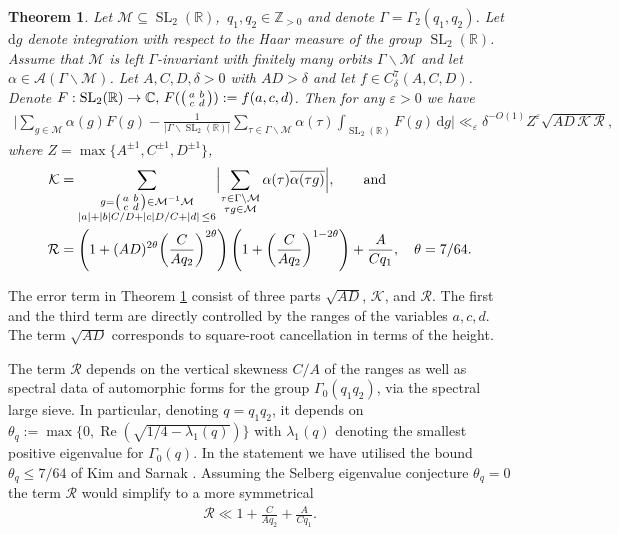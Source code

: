 \documentclass[12pt]{amsart}
\newtheorem{theorem}{Theorem}[section]
\theoremstyle{definition}
\theoremstyle{remark}
\numberwithin{equation}{section}
\newcommand{\C}{{\mathbb C}}
\newcommand{\R}{{\mathbb R}}
\newcommand{\Z}{{\mathbb Z}}
\newcommand{\1}{{\mathbf 1}}
\newcommand{\eps}{\varepsilon}
\newcommand{\SL}{\operatorname{SL}_2}
\renewcommand{\Re}{\operatorname{Re}}
\renewcommand{\c}{\mathfrak c}
\renewcommand{\d}{\mathrm d}
\begin{document}
\begin{theorem} \label{thm:mainblackbox}
Let $\mathcal{M} \subseteq \SL(\R)$,\, $q_1,q_2\in \Z_{>0}$ and denote $\Gamma = \Gamma_2(q_1,q_2)$. Let $\d g$ denote integration with respect to the Haar measure of the group $\SL(\R)$. Assume that $\mathcal{M}$ is left 
$\Gamma$-invariant with finitely many orbits $\Gamma \backslash \mathcal{M}$ and let $\alpha \in \mathcal{A}(\Gamma \backslash \mathcal{M})$.  Let $A,C,D,\delta > 0$  with $AD > \delta$ and let $f \in C^{7}_\delta (A,C,D)$. Denote $F:\SL(\R) \to \C, \, F(\smqty(a & b \\ c& d)):= f(a,c,d)$. Then for any $\eps > 0$ we have
\begin{align*}
   \bigg|  \sum_{g \in \mathcal{M}}  \alpha(g) F(g)  -  \frac{1}{|\Gamma \backslash \SL(\R) |} \sum_{\tau \in \Gamma \backslash \mathcal{M}} \alpha(\tau)  \int_{\SL(\R)} F(g) \, \d g \bigg|  \ll_\eps \delta^{-O(1)} Z^\eps  \sqrt{ AD \, \mathcal{K} \, \mathcal{R}},
\end{align*}
where $Z = \max\{A^{\pm 1},C^{\pm 1},D^{\pm 1}\}$,
\begin{align*}
\mathcal{K}& = \sum_{\substack{g =\smqty(a & b \\c & d) \in \mathcal{M}^{-1} \mathcal{M} \\  |a|+|b|C/D+|c|D/C+|d| \,\leq 6}}\Bigl|\sum_{ \substack{\tau\in \Gamma \backslash \mathcal{M} 
 \\ \tau g \in \mathcal{M}}} \alpha(\tau) \overline{\alpha(\tau g)} \Bigr|, \quad \quad\text{and} \\
\mathcal{R}& =    \left(1+ (AD)^{2\theta}\bigg( \frac{ C}{ A q_2}\bigg)^{2\theta} \right)\left(1+\bigg(\frac{C}{A q_2}\bigg)^{1-2\theta} \right) + \frac{A}{Cq_1}, \quad \theta=7/64.
\end{align*}
\end{theorem}
The error term in Theorem \ref{thm:mainblackbox} consist of three parts $  \sqrt{AD} $, $\mathcal{K}$, and $\mathcal{R}$.  The first and the third term are directly controlled by the ranges of the variables $a,c,d$. The term $\sqrt{AD}$  corresponds to square-root cancellation in terms of the height. 

The term $\mathcal{R}$ depends on the vertical skewness $C/A$ of the ranges as well as spectral data of automorphic forms for the group $\Gamma_0(q_1q_2) $,  via the spectral large sieve. In particular, denoting $q=q_1q_2$, it depends on $\theta_q := \max\{0,\Re(\sqrt{1/4-\lambda_1(q)})\}$ with $\lambda_1(q)$ denoting the smallest positive eigenvalue for $\Gamma_0(q)$. In the statement we have utilised the bound $\theta_q \leq 7/64$  of Kim and Sarnak \cite{KimSarnak}. Assuming the Selberg eigenvalue conjecture $\theta_q=0$ the term $\mathcal{R}$ would simplify to a more symmetrical
\begin{align*}
    \mathcal{R} \ll  1 + \frac{C}{A q_2} +\frac{A}{C q_1}.
\end{align*}
\end{document}
